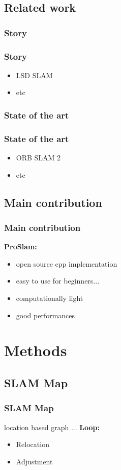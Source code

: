 \documentclass[16pt]{beamer}
\begin{document}
\subsection{Related work}
\subsubsection*{Story}
\begin{frame}
  \frametitle{Story}
  \begin{itemize}
  \item LSD SLAM
  \item etc
  \end{itemize}

\end{frame}
\subsubsection*{State of the art }
\begin{frame}
  \frametitle{State of the art}
  \begin{itemize}
  \item ORB SLAM 2
  \item etc
  \end{itemize}
\end{frame}


\subsection{Main contribution}
\begin{frame}
  \frametitle{Main contribution}
  \textbf{ ProSlam: } \\
  \begin{itemize}
  \item open source cpp implementation
  \item easy to use for beginners...
  \item computationally light
  \item good performances
  \end{itemize}
\end{frame}


\section{ Methods }
\subsection*{SLAM Map}
\begin{frame}
  \frametitle{SLAM Map}

  location based graph ...
  \textbf{ Loop: } \\
  \begin{itemize}
  \item Relocation
  \item Adjustment
  \end{itemize}
\end{frame}
\end{document}
